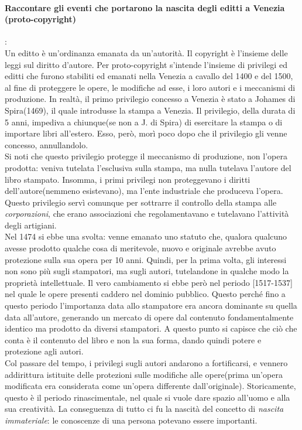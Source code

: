\documentclass[a4paper]{article}
\begin{document}
		\paragraph{Raccontare gli eventi che portarono la nascita degli editti a Venezia (proto-copyright)}:\\
		Un editto è un'ordinanza emanata da un'autorità.
		Il copyright è l'insieme delle leggi sul diritto d'autore.
		Per proto-copyright s'intende l'insieme di privilegi ed editti che furono stabiliti ed emanati nella Venezia a cavallo del 1400 e del 1500, al fine di proteggere le opere, le modifiche ad esse, i loro autori e i meccanismi di produzione.
		In realtà, il primo privilegio concesso a Venezia è stato a Johames di Spira(1469), il quale introdusse la stampa a Venezia. Il privilegio, della durata di 5 anni, impediva a chiunque(se non a J. di Spira) di esercitare la stampa o di importare libri all'estero. Esso, però, morì poco dopo che il privilegio gli venne concesso, annullandolo. \\
		Si noti che questo privilegio protegge il meccanismo di produzione, non l'opera prodotta: veniva tutelata l'esclusiva sulla stampa, ma nulla tutelava l'autore del libro stampato.
		Insomma, i primi privilegi non proteggevano i diritti dell'autore(nemmeno esistevano), ma l'ente industriale che produceva l'opera.
		Questo privilegio servì comunque per sottrarre il controllo della stampa alle \textit{corporazioni}, che erano associazioni che regolamentavano e tutelavano l'attività degli artigiani.\\
		Nel 1474 si ebbe una svolta: venne emanato uno statuto che, qualora qualcuno avesse prodotto qualche cosa di meritevole, nuovo e originale avrebbe avuto protezione sulla sua opera per 10 anni. Quindi, per la prima volta, gli interessi non sono più sugli stampatori, ma sugli autori, tutelandone in qualche modo la proprietà intellettuale.
		Il vero cambiamento si ebbe però nel periodo [1517-1537] nel quale le opere presenti caddero nel dominio pubblico. Questo perché fino a questo periodo l'importanza data allo stampatore era ancora dominante su quella data all'autore, generando un mercato di opere dal contenuto fondamentalmente identico ma prodotto da diversi stampatori. A questo punto si capisce che ciò che conta è il contenuto del libro e non la sua forma, dando quindi potere e protezione agli autori.\\
		Col passare del tempo, i privilegi sugli autori andarono a fortificarsi, e vennero addirittura istituite delle protezioni sulle modifiche alle opere(prima un'opera modificata era considerata come un'opera differente dall'originale).
		Storicamente, questo è il periodo rinascimentale, nel quale si vuole dare spazio all'uomo e alla sua creatività.
		La conseguenza di tutto ci fu la nascità del concetto di \textit{nascita immateriale}: le conoscenze di una persona potevano essere importanti.
		
\end{document}
